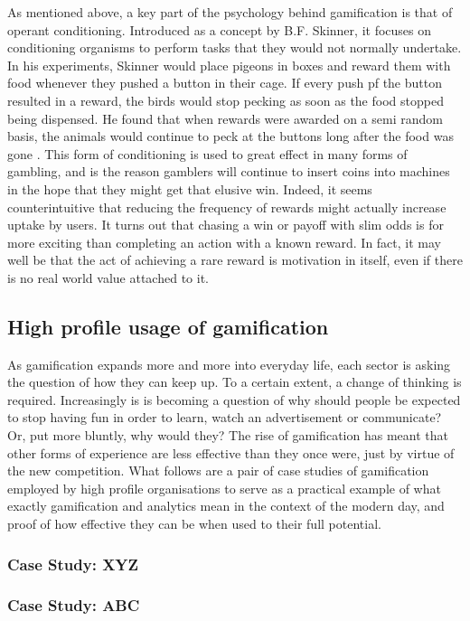 \documentclass{article}
\begin{document}
As mentioned above, a key part of the psychology behind gamification is that of operant conditioning. Introduced as a concept by B.F. Skinner, it focuses on conditioning organisms to perform tasks that they would not normally undertake. In his experiments, Skinner would place pigeons in boxes and reward them with food whenever they pushed a button in their cage. If every push pf the button resulted in a reward, the birds would stop pecking as soon as the food stopped being dispensed. He found that when rewards were awarded on a semi random basis, the animals would continue to peck at the buttons long after the food was gone \cite{kapp2012gamification}. This form of conditioning is used to great effect in many forms of gambling, and is the reason gamblers will continue to insert coins into machines in the hope that they might get that elusive win. Indeed, it seems counterintuitive that reducing the frequency of rewards might actually increase uptake by users. It turns out that chasing a win or payoff with slim odds is for more exciting than completing an action with a known reward. In fact, it may well be that the act of achieving a rare reward is motivation in itself, even if there is no real world value attached to it.

\subsection{High profile usage of gamification}
As gamification expands more and more into everyday life, each sector is asking the question of how they can keep up. To a certain extent, a change of thinking is required. Increasingly is is becoming a question of why should people be expected to stop having fun in order to learn, watch an advertisement or communicate? \cite{zichermann2010game} Or, put more bluntly, why would they? The rise of gamification has meant that other forms of experience are less effective than they once were, just by virtue of the new competition. What follows are a pair of case studies of gamification employed by high profile organisations to serve as a practical example of what exactly gamification and analytics mean in the context of the modern day, and proof of how effective they can be when used to their full potential.

\subsubsection{Case Study: XYZ}

\subsubsection{Case Study: ABC}
\end{document}
